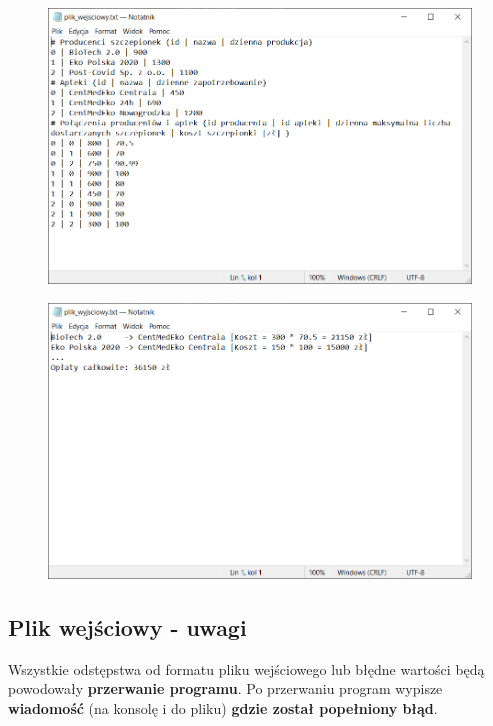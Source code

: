 \documentclass{article}
\begin{document}
\begin{figure} [hbt!]
    \includegraphics[width=12cm,center]{images/plik_wejsciowy.PNG}
\end{figure}

\begin{figure} [hbt!]
    \includegraphics[width=12cm,center]{images/plik_wyjsciowy.PNG}
\end{figure}

\clearpage

\subsection{Plik wejściowy - uwagi}
Wszystkie odstępstwa od formatu pliku wejściowego lub błędne wartości będą powodowały \textbf{przerwanie programu}. Po przerwaniu program wypisze \textbf{wiadomość} (na konsolę i do pliku) \textbf{gdzie został popełniony błąd}.
\end{document}
